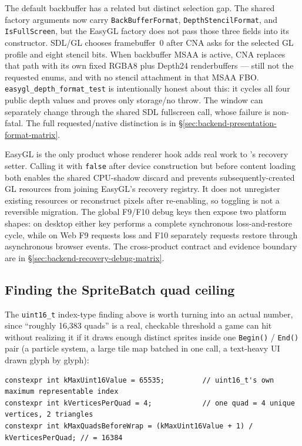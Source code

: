 The default backbuffer has a related but distinct selection gap. The shared factory arguments
now carry \texttt{BackBufferFormat}, \texttt{DepthStencilFormat}, and \texttt{IsFullScreen}, but
the EasyGL factory does not pass those three fields into its constructor. SDL/GL chooses
framebuffer~0 after CNA asks for the selected GL profile and eight stencil bits. When backbuffer
MSAA is active, CNA replaces that path with its own
fixed RGBA8 plus Depth24 renderbuffers --- still not the requested enums, and with no stencil
attachment in that MSAA FBO. \texttt{easygl\_depth\_format\_test} is intentionally honest
about this: it cycles all four public depth values and proves only storage/no throw. The
window can separately change through the shared SDL fullscreen call, whose failure is
non-fatal. The full requested/native distinction is in
\S\ref{sec:backend-presentation-format-matrix}.

\begin{sourcenote}
EasyGL is the only product whose renderer hook adds real work to
's recovery setter. Calling it with \texttt{false} after device
construction but before content loading both enables the shared
 CPU-shadow discard and prevents subsequently-created GL resources from
joining EasyGL's recovery registry. It does not unregister existing resources or reconstruct
pixels after re-enabling, so toggling is not a reversible migration. The global F9/F10 debug
keys then expose two platform shapes: on desktop either key performs a complete synchronous
loss-and-restore cycle, while on Web F9 requests loss and F10 separately requests restore
through asynchronous browser events. The cross-product contract and evidence boundary are in
\S\ref{sec:backend-recovery-debug-matrix}.
\end{sourcenote}

\subsection{Finding the SpriteBatch quad ceiling}

The \texttt{uint16\_t} index-type finding above is worth turning into an actual number, since
``roughly 16{,}383 quads'' is a real, checkable threshold a game can hit without realizing it
if it draws enough distinct sprites inside one \texttt{Begin()} / \texttt{End()} pair (a
particle system, a large tile map batched in one call, a text-heavy UI drawn glyph by glyph):

\begin{lstlisting}
constexpr int kMaxUint16Value = 65535;         // uint16_t's own maximum representable index
constexpr int kVerticesPerQuad = 4;            // one quad = 4 unique vertices, 2 triangles
constexpr int kMaxQuadsBeforeWrap = (kMaxUint16Value + 1) / kVerticesPerQuad; // = 16384
\end{lstlisting}

